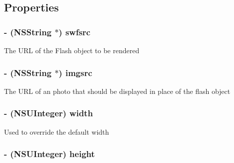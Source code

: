 \subsection{Properties}
\hypertarget{interface_j_r_flash_media_object_a5a79b3d8071ac0286b3ee60e9e0138d0}{
\subsubsection[{swfsrc}]{\setlength{\rightskip}{0pt plus 5cm}-\/ (NSString $\ast$) swfsrc}}
\label{interface_j_r_flash_media_object_a5a79b3d8071ac0286b3ee60e9e0138d0}
The URL of the Flash object to be rendered \hypertarget{interface_j_r_flash_media_object_a5a26cacd216012b37900445a8161ac56}{
\subsubsection[{imgsrc}]{\setlength{\rightskip}{0pt plus 5cm}-\/ (NSString $\ast$) imgsrc}}
\label{interface_j_r_flash_media_object_a5a26cacd216012b37900445a8161ac56}
The URL of an photo that should be displayed in place of the flash object \hypertarget{interface_j_r_flash_media_object_aaeb77e697438b7aa6e44f52bea0ed9c2}{
\subsubsection[{width}]{\setlength{\rightskip}{0pt plus 5cm}-\/ (NSUInteger) width}}
\label{interface_j_r_flash_media_object_aaeb77e697438b7aa6e44f52bea0ed9c2}
Used to override the default width \hypertarget{interface_j_r_flash_media_object_a0689e19fdf6cb9d3911878a95d6ebcc9}{
\subsubsection[{height}]{\setlength{\rightskip}{0pt plus 5cm}-\/ (NSUInteger) height}}
